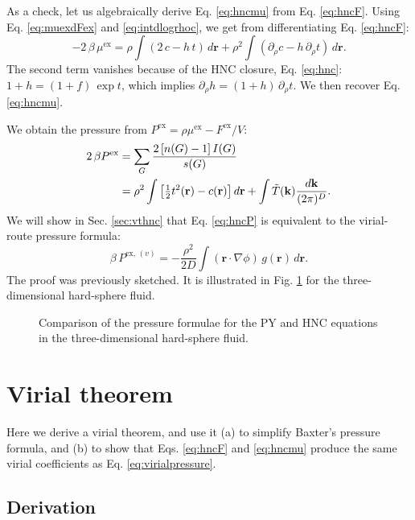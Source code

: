 \documentclass[preprint]{revtex4-1}
\newcommand{\vct}[1]{\mathbf{#1}}
\providecommand{\vr}{} %
\renewcommand{\vr}{\vct{r}}
\newcommand{\vk}{\vct{k}}
\newcommand{\dvk}{\frac{d\vk}{(2\pi)^D}}
\newcommand{\supex}[1]{ { { #1 }^{ \mathrm{ex} } } }
\newcommand{\supexv}[1]{ { { #1 }^{ \mathrm{ex}, \, (v) } } }
\newcommand{\Pex}{\supex{P}}
\newcommand{\Pexv}{\supexv{P}}
\newcommand{\Fex}{\supex{F}}
\newcommand{\muex}{\supex{\mu}}
\begin{document}
As a check, let us algebraically
derive Eq. \eqref{eq:hncmu} from Eq. \eqref{eq:hncF}.
%
Using Eq. \eqref{eq:muexdFex} and \eqref{eq:intdlogrhoc},
we get from differentiating Eq. \eqref{eq:hncF}:
\[
  -2 \, \beta \, \muex = \rho \int (2\,c - h \, t) \, d\vr
  + \rho^2 \int (\partial_\rho c - h \, \partial_\rho t) \, d\vr.
\]
The second term vanishes because of the HNC closure, Eq. \eqref{eq:hnc}:
$1+h = (1+f) \, \exp t$,
%
  which implies $\partial_\rho h = (1+ h) \, \partial_\rho t$.
%
We then recover Eq. \eqref{eq:hncmu}.



We obtain the pressure from
  $\Pex = \rho \muex - \Fex/V$:
%
\begin{align}
2 \, \beta \Pex
&=
\sum_G \frac{ 2 \, [n(G) - 1] \, I(G) } { s(G) }
\notag \\
&=
\rho^2 \int
  \left[
    \tfrac{1}{2} t^2(\vr) - c(\vr)
  \right] d\vr
  +\int \tilde T(\vk) \dvk.
\label{eq:hncP}
\end{align}
%
We will show in Sec. \ref{sec:vthnc} that
Eq. \eqref{eq:hncP}
is equivalent to the virial-route pressure formula:
\begin{equation}
  \beta \, \Pexv
=
  - \frac{\rho^2}{2D}
  \int (\vr \cdot \nabla\phi) \, g(\vr) \, d\vr.
\label{eq:virialpressure}
\end{equation}
%
The proof was previously sketched\cite{
morita1960, morita1960I}.
%
It is illustrated in Fig. \ref{fig:iepres}
for the three-dimensional hard-sphere fluid.

\begin{figure}[h]
  \caption{\label{fig:iepres}
  Comparison of the pressure formulae for the PY and HNC equations
  in the three-dimensional hard-sphere fluid.}
\end{figure}





\section{\label{sec:virialtheorem}Virial theorem}

Here we derive a virial theorem,
and use it
(a) to simplify Baxter's pressure formula,
and
(b) to show that Eqs. \eqref{eq:hncF} and \eqref{eq:hncmu}
produce the same virial coefficients as Eq. \eqref{eq:virialpressure}.



\subsection{Derivation}
\end{document}
